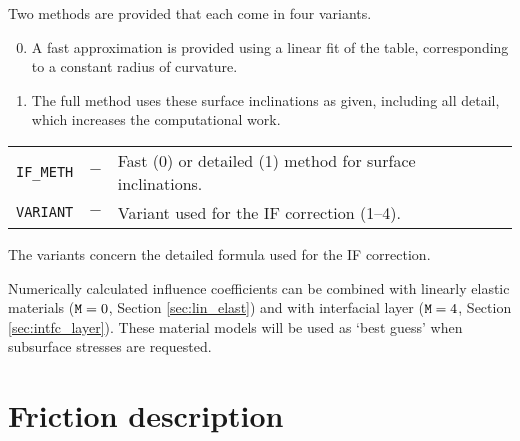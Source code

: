 \documentclass[12pt]{report}
\renewcommand{\magenta}[1]{}
\newenvironment{inputvars}{\vspace{0.4\baselineskip}%

\begin{tabular}{>{\raggedright}p{22mm}p{19mm}p{113mm}}}{
\end{tabular}

}
\newcommand{\inpvar}[3]{{\small\tt #1} & $#2$ & #3 \\[1ex]}
\begin{document}
Two methods are provided that each come in four variants. 
\begin{enumerate}\setcounter{enumi}{-1}
\item A fast approximation is provided using a linear fit of the table,
        corresponding to a constant radius of curvature.
\item The full method uses these surface inclinations as given,
        including all detail, which increases the computational work.
\end{enumerate}
\begin{inputvars}
\inpvar{IF\_METH}{-}{Fast (0) or detailed (1) method for surface
        inclinations.}
\inpvar{VARIANT}{-}{Variant used for the IF correction (1--4).}
\end{inputvars}
The variants concern the detailed formula used for the IF correction.
\magenta{
\begin{enumerate}
\item Blanco-proposal, decomposing pressures $\vec{p}$;
\item same, without $B_{xn}$ correction;
\item Vollebregt-proposal, transforming displacements $\vec{u}$;
\item Combined proposal, using $\vec{p}$ and $\vec{u}$.
\end{enumerate}
}

Numerically calculated influence coefficients can be combined with linearly
elastic materials (${\tt M}=0$, Section \ref{sec:lin_elast}) and with
interfacial layer (${\tt M}=4$, Section \ref{sec:intfc_layer}). These
material models will be used as `best guess' when subsurface stresses
are requested.

\section{Friction description}
\label{sec:fric_dscrp}
\end{document}
